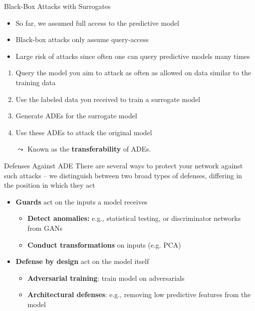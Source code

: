 \documentclass[11pt,compress,t,notes=noshow, aspectratio=169, xcolor=table]{beamer}
\begin{document}
\begin{vbframe}[c]{Black-Box Attacks with Surrogates }

\begin{itemize}
    \item So far, we assumed full access to the predictive model
    \item Black-box attacks only assume query-access
    \item Large risk of attacks since often one can query predictive models many times
\end{itemize}

\medskip
\begin{enumerate}
    \item Query the model you aim to attack as often as allowed on data similar to the training data
    \item Use the labeled data you received to train a surrogate model
    \item Generate ADEs for the surrogate model
    \item Use these ADEs to attack the original model
\end{enumerate}

\medskip
\begin{itemize}
    \item[$\leadsto$] Known as the \textbf{transferability} of ADEs.
\end{itemize}



\end{vbframe}

\begin{vbframe}[c]{Defenses Against ADE}
There are several ways to protect your network against such attacks -- we distinguish between two broad types of defenses, differing in the position in which they act
\begin{itemize}
    \item \textbf{Guards} act on the inputs a model receives
    \begin{itemize}
        \item \textbf{Detect anomalies:} e.g., statistical testing, or discriminator networks from GANs
        \item \textbf{Conduct transformations} on inputs (e.g. PCA)
    \end{itemize}
    \item \textbf{Defense by design} act on the model itself
    \begin{itemize}
        \item \textbf{Adversarial training}: train model on adversarials
        \item \textbf{Architectural defenses}: e.g., removing low predictive features from the model
    \end{itemize}
\end{itemize}
\end{vbframe}
\end{document}
